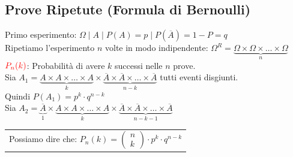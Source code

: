 \documentclass{article}
\begin{document}
\subsection{Prove Ripetute (Formula di Bernoulli)}
Primo esperimento: $\Omega  \;\big|\; A \;\big|\; P(A) = p \;\big|\; P(\overline A) = 1-P = q$ \\
Ripetiamo l’esperimento $n$ volte in modo indipendente: $\Omega^{R} = \underset{n}{\underbrace{\Omega \times \Omega \times \dots \times \Omega}}$ \\
$\color{red}P_n(k)$: Probabilità di avere $k$ successi nelle $n$ prove. \\ 
Sia $A_1 = \underset{k}{\underbrace{A \times A \times \dots \times A}} \times \underset{n-k}{\underbrace{\overline A \times \overline A \times  \dots \times  \overline A}}$ tutti eventi disgiunti. \\
Quindi $P(A_1) = p^k \cdot q^{n-k }$ \\
Sia $A_2 = \underset{1}{\underbrace{\overline A}} \times\underset{k}{\underbrace{A \times A \times \dots \times A}} \times \underset{n-k-1}{\underbrace{\overline A \times \overline A \times  \dots \times  \overline A}}$ \\
\begin{tabular}{|p{13cm}}
Possiamo dire che: $P_n(k) = \left( \begin{matrix} n \\ k \end{matrix}\right) \cdot p^k\cdot q^{n-k}$
\end{tabular}
\newpage
\end{document}
